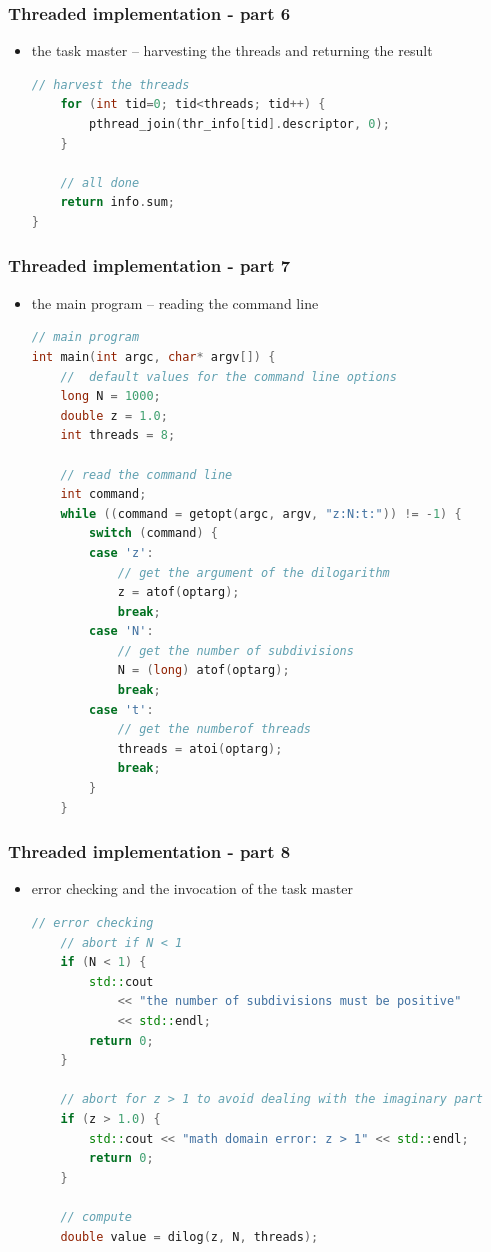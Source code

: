 \begin{frame}[fragile]
%
  \frametitle{Threaded implementation - part 6}
%
  \begin{itemize}
  \item the task master -- harvesting the threads and returning the result
  \begin{lstlisting}[language=c++,name=threaded]
    // harvest the threads
    for (int tid=0; tid<threads; tid++) {
        pthread_join(thr_info[tid].descriptor, 0);
    }

    // all done
    return info.sum;
}
  \end{lstlisting}
%
  \end{itemize}
%
\end{frame}

\begin{frame}[fragile]
%
  \frametitle{Threaded implementation - part 7}
%
  \begin{itemize}
  \item the main program -- reading the command line
  \begin{lstlisting}[language=c++,name=threaded]
// main program
int main(int argc, char* argv[]) {
    //  default values for the command line options
    long N = 1000;
    double z = 1.0;
    int threads = 8;

    // read the command line
    int command;
    while ((command = getopt(argc, argv, "z:N:t:")) != -1) {
        switch (command) {
        case 'z':
            // get the argument of the dilogarithm 
            z = atof(optarg);
            break;
        case 'N':
            // get the number of subdivisions
            N = (long) atof(optarg);
            break;
        case 't':
            // get the numberof threads
            threads = atoi(optarg);
            break;
        }
    }
  \end{lstlisting}
%
  \end{itemize}
%
\end{frame}

\begin{frame}[fragile]
%
  \frametitle{Threaded implementation - part 8}
%
  \begin{itemize}
  \item error checking and the invocation of the task master
  \begin{lstlisting}[language=c++,name=threaded]
    // error checking
    // abort if N < 1
    if (N < 1) {
        std::cout 
            << "the number of subdivisions must be positive"
            << std::endl;
        return 0;
    }

    // abort for z > 1 to avoid dealing with the imaginary part
    if (z > 1.0) {
        std::cout << "math domain error: z > 1" << std::endl;
        return 0;
    } 

    // compute
    double value = dilog(z, N, threads);
  \end{lstlisting}
%
  \end{itemize}
%
\end{frame}

